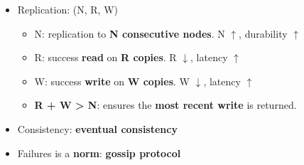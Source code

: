 \begin{itemize}
\begin{itemize}
\begin{itemize}
		\end{itemize}
		\item Replication: (N, R, W)
		\begin{itemize}
			\item N: replication to \textbf{N consecutive nodes}. N $\uparrow$, durability $\uparrow$
			\item R: success \textbf{read} on \textbf{R copies}. R $\downarrow$, latency $\uparrow$
			\item W: success \textbf{write} on \textbf{W copies}. W $\downarrow$, latency $\uparrow$
			\item \textbf{R + W > N}: ensures the \textbf{most recent write} is returned.
		\end{itemize}
		\item Consistency: \textbf{eventual consistency}
		\item Failures is a \textbf{norm}: \textbf{gossip protocol}
		

	\end{itemize} 
\end{itemize}


